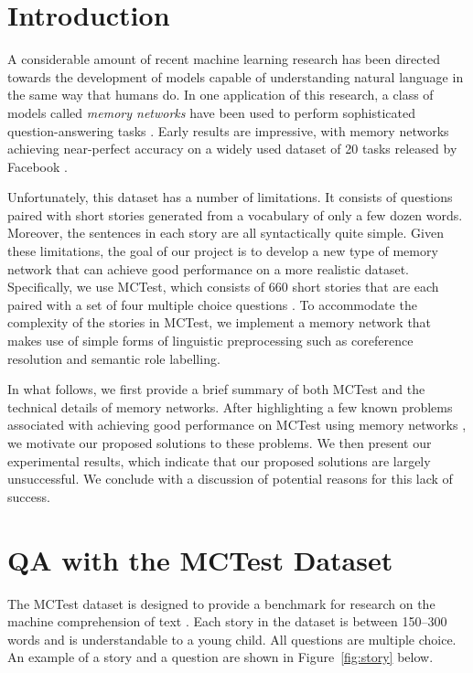 \documentclass[10pt]{article}
\begin{document}
\section{Introduction}

A considerable amount of recent machine learning research has been directed towards the development of models capable of understanding natural language in the same way that humans do. In one application of this research, a class of models called \textit{memory networks} have been used to perform sophisticated question-answering tasks \cite{Weston:2015a,Sukhbaatar:2015,Darshan:2015}. Early results are impressive, with memory networks achieving near-perfect accuracy on a widely used dataset of 20 tasks released by Facebook \cite{Weston:2015b}. 

Unfortunately, this dataset has a number of limitations. It consists of questions paired with short stories generated from a vocabulary of only a few dozen words. Moreover, the sentences in each story are all syntactically quite simple. Given these limitations, the goal of our project is to develop a new type of memory network that can achieve good performance on a more realistic dataset. Specifically, we use MCTest, which consists of 660 short stories that are each paired with a set of four multiple choice questions \cite{Richardson:2013}. To accommodate the complexity of the stories in MCTest, we implement a memory network that makes use of simple forms of linguistic preprocessing such as coreference resolution and semantic role labelling.  
    
In what follows, we first provide a brief summary of both MCTest and the technical details of memory networks. After highlighting a few known problems associated with achieving good performance on MCTest using memory networks \cite{Darshan:2015}, we motivate our proposed solutions to these problems. We then present our experimental results, which indicate that our proposed solutions are largely unsuccessful. We conclude with a discussion of potential reasons for this lack of success. 

\section{QA with the MCTest Dataset}
The MCTest dataset is designed to provide a benchmark for research on the 
machine comprehension of text \cite{Richardson:2013}. Each story in the dataset 
is between 150--300 words and is understandable to a young child. All questions 
are multiple choice. An example of a story and a question are shown in 
Figure~\ref{fig:story} below.
\end{document}

